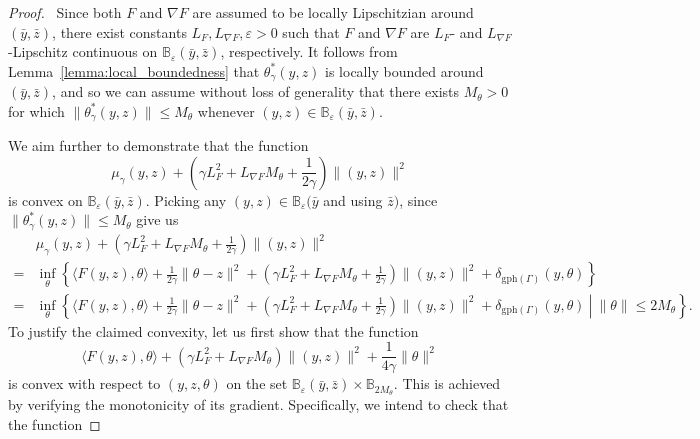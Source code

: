 \documentclass[11pt,a4paper]{article}
\theoremstyle{plain}
\begin{document}
\begin{proof}\, Since both $F$ and $\nabla F$ are assumed to be locally Lipschitzian around $(\bar{y}, \bar{z})$, there exist constants $L_F, L_{\nabla F}, \varepsilon > 0$ such that $F$ and $\nabla F$ are $L_F$- and $L_{\nabla F}$-Lipschitz continuous on $\mathbb{B}_{\varepsilon}(\bar{y}, \bar{z})$, respectively. It follows from 
Lemma~\ref{lemma:local_boundedness} that \( \theta_\gamma^*(y, z)\) is locally bounded around $(\bar{y}, \bar{z})$, and so we can assume without loss of generality that there exists $M_\theta > 0$ for which $ \| \theta_\gamma^*(y, z) \| \le M_{\theta}$ whenever $(y,z) \in \mathbb{B}_{\varepsilon}(\bar{y}, \bar{z})$.
	
We aim further to demonstrate that the function
\begin{equation}
\mu_\gamma(y, z) + \left(  \gamma L_F^2 + L_{\nabla F}M_\theta + \frac{1}{2\gamma}\right)\|(y, z)\|^2
\end{equation}
is convex on $\mathbb{B}_{\varepsilon}(\bar{y}, \bar{z})$. Picking any $(y,z) \in \mathbb{B}_{\varepsilon}(\bar{y}$ and using $\bar{z})$, since $ \| \theta_\gamma^*(y, z) \| \le M_{\theta}$ give us
\begin{equation}\label{thm_proxreg_eq2}
\begin{aligned}
& \mu_\gamma(y, z) + \left( \gamma L_F^2 + L_{\nabla F}M_\theta + \frac{1}{2\gamma} \right)\|(y, z)\|^2 \\
=&\inf\limits_{\theta} \left\{  
\langle F(y,z), \theta \rangle + \frac{1}{2\gamma} \|\theta - z\|^2 + \left( \gamma L_F^2 + L_{\nabla F}M_\theta + \frac{1}{2\gamma}\right)\|(y,z)\|^2 + \delta_{\mathrm{gph}(\Gamma)}(y, \theta) 	\right\} \\
=&\inf\limits_{\theta} \left\{  \left.
\langle F(y,z), \theta \rangle + \frac{1}{2\gamma} \|\theta - z\|^2 + \left( \gamma L_F^2 + L_{\nabla F}M_\theta + \frac{1}{2\gamma}\right)\|(y,z)\|^2 + \delta_{\mathrm{gph}(\Gamma)}(y, \theta) 
~\right|~ \| \theta \| \le 2M_{\theta} 	\right\}. 
\end{aligned}
\end{equation}
To justify the claimed convexity, let us first show that the function
\begin{equation}\label{Fconvex}
\langle F(y,z), \theta \rangle + (\gamma L_F^2+ L_{\nabla F}M_\theta)
\|(y,z)\|^2
+ \frac{1}{4\gamma}\|\theta\|^2
\end{equation}
is convex with respect to $(y,z, \theta)$ on the set $\mathbb{B}_{\varepsilon}(\bar{y}, \bar{z}) \times \mathbb{B}_{ 2M_{\theta}}$. This is achieved by verifying the monotonicity of its gradient. Specifically, we intend to check that the function

\end{proof}
\end{document}

